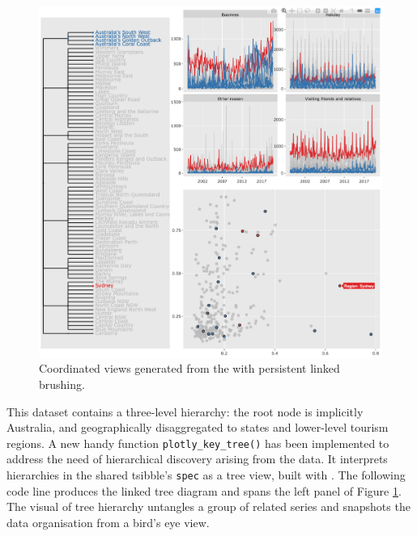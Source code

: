 \begin{Schunk}
\begin{figure}

{\centering \includegraphics[width=\textwidth]{img/tourism-linking} 

}

\caption[Coordinated views generated from the  with persistent linked brushing]{Coordinated views generated from the  with persistent linked brushing.}\label{fig:tourism-linking-fig}
\end{figure}
\end{Schunk}

This dataset contains a three-level hierarchy: the root node is
implicitly Australia, and geographically disaggregated to states and
lower-level tourism regions. A new handy function
\texttt{plotly\_key\_tree()} has been implemented to address the need of
hierarchical discovery arising from the data. It interprets hierarchies
in the shared tsibble's \texttt{spec} as a tree view, built with
. The following code line produces the linked tree
diagram and spans the left panel of Figure
\ref{fig:tourism-linking-fig}. The visual of tree hierarchy untangles a
group of related series and snapshots the data organisation from a
bird's eye view.

